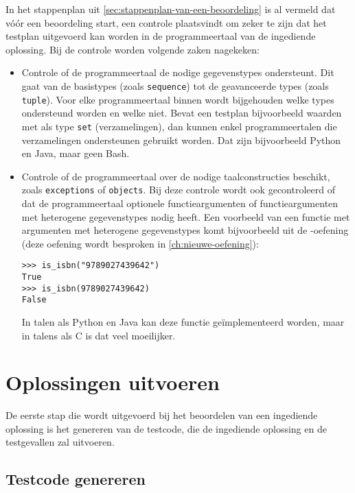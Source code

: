 In het stappenplan uit \cref{sec:stappenplan-van-een-beoordeling} is al vermeld dat vóór een beoordeling start, een controle plaatsvindt om zeker te zijn dat het testplan uitgevoerd kan worden in de programmeertaal van de ingediende oplossing.
Bij de controle worden volgende zaken nagekeken:
\begin{itemize}
    \item Controle of de programmeertaal de nodige gegevenstypes ondersteunt.
    Dit gaat van de basistypes (zoals \texttt{sequence}) tot de geavanceerde types (zoals \texttt{tuple}).
    Voor elke programmeertaal binnen \tested{} wordt bijgehouden welke types ondersteund worden en welke niet.
    Bevat een testplan bijvoorbeeld waarden met als type \texttt{set} (verzamelingen), dan kunnen enkel programmeertalen die verzamelingen ondersteunen gebruikt worden.
    Dat zijn bijvoorbeeld Python en Java, maar geen Bash.
    \item Controle of de programmeertaal over de nodige taalconstructies beschikt, zoals \texttt{exceptions} of \texttt{objects}.
    Bij deze controle wordt ook gecontroleerd of dat de programmeertaal optionele functieargumenten of functieargumenten met heterogene gegevenstypes nodig heeft.
    Een voorbeeld van een functie met argumenten met heterogene gegevenstypes komt bijvoorbeeld uit de -oefening (deze oefening wordt besproken in \cref{ch:nieuwe-oefening}):
    \begin{verbatim}
>>> is_isbn("9789027439642")
True
>>> is_isbn(9789027439642)
False
    \end{verbatim}
    In talen als Python en Java kan deze functie geïmplementeerd worden, maar in talens als C is dat veel moeilijker.
\end{itemize}

\section{Oplossingen uitvoeren}\label{sec:oplossingen-uitvoeren}

De eerste stap die wordt uitgevoerd bij het beoordelen van een ingediende oplossing is het genereren van de testcode, die de ingediende oplossing en de testgevallen zal uitvoeren.

\subsection{Testcode genereren}\label{subsec:testcode-genereren}


